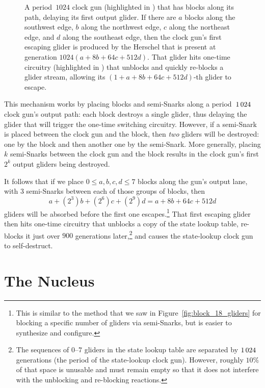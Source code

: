 \begin{figure}[!htb]
	\centering
	\caption{A period~$1024$ clock gun (highlighted in ) that has blocks along its path, delaying its first output glider. If there are $a$ blocks along the southwest edge, $b$ along the northwest edge, $c$ along the northeast edge, and $d$ along the southeast edge, then the clock gun's first escaping glider is produced by the Herschel that is present at generation $1024(a + 8b + 64c + 512d)$. That glider hits one-time circuitry (highlighted in ) that unblocks and quickly re-blocks a glider stream, allowing its $(1 + a + 8b + 64c + 512d)$-th glider to escape.}
	\label{fig:state_lookup_clock_gun}
\end{figure}

This mechanism works by placing blocks and semi-Snarks along a period~$1{\,}024$ clock gun's output path: each block destroys a single glider, thus delaying the glider that will trigger the one-time switching circuitry. However, if a semi-Snark is placed between the clock gun and the block, then \emph{two} gliders will be destroyed: one by the block and then another one by the semi-Snark. More generally, placing $k$ semi-Snarks between the clock gun and the block results in the clock gun's first $2^k$ output gliders being destroyed.

It follows that if we place $0 \leq a,b,c,d \leq 7$ blocks along the gun's output lane, with $3$ semi-Snarks between each of those groups of blocks, then
\[
	a + (2^3)b + (2^6)c + (2^9)d = a + 8b + 64c + 512d
\]
gliders will be absorbed before the first one escapes.\footnote{This is similar to the method that we saw in Figure~\ref{fig:block_18_gliders} for blocking a specific number of gliders via semi-Snarks, but is easier to synthesize and configure.} That first escaping glider then hits one-time circuitry that unblocks a copy of the state lookup table, re-blocks it just over $900$ generations later,\footnote{The sequences of $0$--$7$ gliders in the state lookup table are separated by $1{\,}024$ generations (the period of the state-lookup clock gun). However, roughly $10\%$ of that space is unusable and must remain empty so that it does not interfere with the unblocking and re-blocking reactions.} and causes the state-lookup clock gun to self-destruct.


\section{The Nucleus}\label{sec:0e0p_structure_nucleus}

